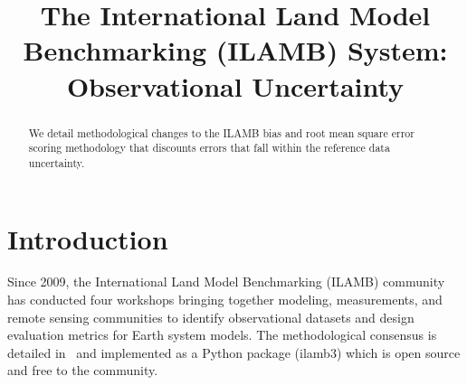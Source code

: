 \documentclass{agujournal}
\begin{document}
\title{The International Land Model Benchmarking (ILAMB) System: Observational Uncertainty}




\begin{abstract}

	We detail methodological changes to the ILAMB bias and root mean square error scoring methodology that discounts errors that fall within the reference data uncertainty.

\end{abstract}

\section{Introduction}\label{sec:intro}

Since 2009, the International Land Model Benchmarking (ILAMB) community has conducted four workshops bringing together modeling, measurements, and remote sensing communities to identify observational datasets and design  evaluation metrics for Earth system models. The methodological consensus is detailed in~\cite{Collier_JAMES_20181101} and implemented as a Python package ({ilamb3}) which is open source and free to the community.
\end{document}

